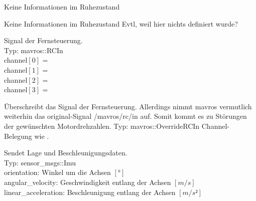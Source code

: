 

















Keine Informationen im Ruhezustand

Keine Informationen im Ruhezustand
Evtl, weil hier nichts definiert wurde?
















Signal der Fernsteuerung. \\
Typ: mavros::RCIn \\
channel$[0]$ = \\
channel$[1]$ = \\
channel$[2]$ = \\
channel$[3]$ = 


Überschreibt das Signal der Fernsteuerung. Allerdings nimmt mavros vermutlich weiterhin das original-Signal /mavros/rc/in auf. Somit kommt es zu Störungen der gewünschten Motordrehzahlen. 
Typ: mavros::OverrideRCIn
Channel-Belegung wie .













Sendet Lage und Beschleunigungsdaten.\\
Typ: sensor\_msgs::Imu \\
orientation: Winkel um die Achsen $[°]$\\
angular\_velocity: Geschwindigkeit entlang der Achsen $[m/s]$\\
linear\_acceleration: Beschleunigung entlang der Achsen $[m/s²]$


